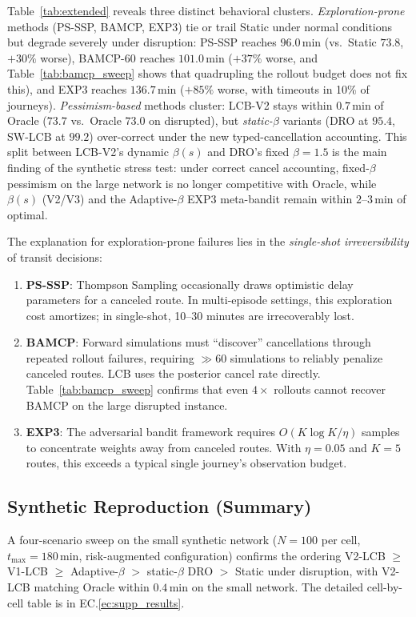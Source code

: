 \documentclass[opre,dblanonrev]{informs4}
\begin{document}
Table~\ref{tab:extended} reveals three distinct behavioral clusters.
\emph{Exploration-prone} methods (PS-SSP, BAMCP, EXP3) tie or trail
Static under normal conditions but degrade severely under disruption:
PS-SSP reaches $96.0$\,min (vs.\ Static $73.8$, $+30\%$ worse),
BAMCP-60 reaches $101.0$\,min ($+37\%$ worse, and Table~\ref{tab:bamcp_sweep}
shows that quadrupling the rollout budget does not fix this), and
EXP3 reaches $136.7$\,min ($+85\%$ worse, with timeouts in 10\% of
journeys). \emph{Pessimism-based} methods cluster: LCB-V2 stays
within $0.7$\,min of Oracle ($73.7$ vs.\ Oracle $73.0$ on
disrupted), but \emph{static-$\beta$} variants (DRO at $95.4$,
SW-LCB at $99.2$) over-correct under the new typed-cancellation
accounting. This split between LCB-V2's dynamic $\beta(s)$ and
DRO's fixed $\beta=1.5$ is the main finding of the synthetic stress test:
under correct cancel accounting, fixed-$\beta$ pessimism on the
large network is no longer competitive with Oracle, while
$\beta(s)$ (V2/V3) and the Adaptive-$\beta$ EXP3 meta-bandit
remain within $2$--$3$\,min of optimal.

The explanation for exploration-prone failures lies in the
\emph{single-shot irreversibility} of transit decisions:
\begin{enumerate}
    \item \textbf{PS-SSP}: Thompson Sampling occasionally draws optimistic delay parameters for a canceled route. In multi-episode settings, this exploration cost amortizes; in single-shot, 10--30 minutes are irrecoverably lost.
    \item \textbf{BAMCP}: Forward simulations must ``discover'' cancellations through repeated rollout failures, requiring ${\gg}60$ simulations to reliably penalize canceled routes. LCB uses the posterior cancel rate directly. Table~\ref{tab:bamcp_sweep} confirms that even $4{\times}$ rollouts cannot recover BAMCP on the large disrupted instance.
    \item \textbf{EXP3}: The adversarial bandit framework requires $O(K \log K / \eta)$ samples to concentrate weights away from canceled routes. With $\eta{=}0.05$ and $K{=}5$ routes, this exceeds a typical single journey's observation budget.
\end{enumerate}

\subsection{Synthetic Reproduction (Summary)}
\label{sec:synth-repro}
A four-scenario sweep on the small synthetic network
($N{=}100$ per cell, $t_{\max}{=}180$\,min, risk-augmented configuration)
confirms the ordering V2-LCB $\geq$ V1-LCB $\geq$ Adaptive-$\beta$
$>$ static-$\beta$ DRO $>$ Static under disruption, with V2-LCB
matching Oracle within $0.4$\,min on the small network. The
detailed cell-by-cell table is in
EC.\ref{ec:supp_results}.
\end{document}
